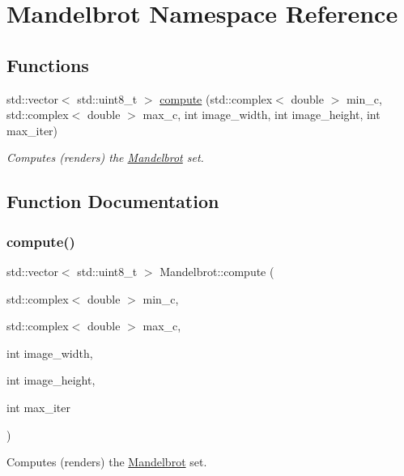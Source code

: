 \hypertarget{namespaceMandelbrot}{}\section{Mandelbrot Namespace Reference}
\label{namespaceMandelbrot}
\subsection*{Functions}
\begin{DoxyCompactItemize}
\item 
std\+::vector$<$ std\+::uint8\+\_\+t $>$ \hyperlink{namespaceMandelbrot_a232cfba00967f21fe3681d195471ef5e}{compute} (std\+::complex$<$ double $>$ min\+\_\+c, std\+::complex$<$ double $>$ max\+\_\+c, int image\+\_\+width, int image\+\_\+height, int max\+\_\+iter)
\begin{DoxyCompactList}\small\item\em Computes (renders) the \hyperlink{namespaceMandelbrot}{Mandelbrot} set. \end{DoxyCompactList}\end{DoxyCompactItemize}


\subsection{Function Documentation}
\mbox{\label{namespaceMandelbrot_a232cfba00967f21fe3681d195471ef5e}} 
\subsubsection{\texorpdfstring{compute()}{compute()}}
{\footnotesize\ttfamily std\+::vector$<$ std\+::uint8\+\_\+t $>$ Mandelbrot\+::compute (\begin{DoxyParamCaption}\item[{std\+::complex$<$ double $>$}]{min\+\_\+c,  }\item[{std\+::complex$<$ double $>$}]{max\+\_\+c,  }\item[{int}]{image\+\_\+width,  }\item[{int}]{image\+\_\+height,  }\item[{int}]{max\+\_\+iter }\end{DoxyParamCaption})}



Computes (renders) the \hyperlink{namespaceMandelbrot}{Mandelbrot} set. 


